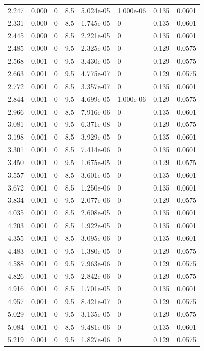 \documentclass[preview]{standalone}
\begin{document}
{{\begin{tabular}{L{1.2cm}C{1.2cm} C{0.3cm}C{0.5cm} C{1.4cm}C{1.4cm} C{1.4cm}C{1.4cm}}
  2.247  &  0.000  & 0     & 8.5 &  5.024e-05  & 1.000e-06  & 0.135 &  0.0601   \\ 
  2.331  &  0.000  & 0     & 8.5 &  1.745e-05  & 0  & 0.135 &  0.0601   \\ 
  2.445  &  0.000  & 0     & 8.5 &  2.221e-05  & 0  & 0.135 &  0.0601   \\ 
  2.485  &  0.000  & 0     & 9.5 &  2.325e-05  & 0  & 0.129 &  0.0575   \\ 
  2.568  &  0.001  & 0     & 9.5 &  3.430e-05  & 0  & 0.129 &  0.0575   \\ 
  2.663  &  0.001  & 0     & 9.5 &  4.775e-07  & 0  & 0.129 &  0.0575   \\ 
  2.772  &  0.001  & 0     & 8.5 &  3.357e-07  & 0  & 0.135 &  0.0601   \\ 
  2.844  &  0.001  & 0     & 9.5 &  4.699e-05  & 1.000e-06  & 0.129 &  0.0575   \\ 
  2.966  &  0.001  & 0     & 8.5 &  7.916e-06  & 0  & 0.135 &  0.0601   \\ 
  3.081  &  0.001  & 0     & 9.5 &  6.371e-08  & 0  & 0.129 &  0.0575   \\ 
  3.198  &  0.001  & 0     & 8.5 &  3.929e-05  & 0  & 0.135 &  0.0601   \\ 
  3.301  &  0.001  & 0     & 8.5 &  7.414e-06  & 0  & 0.135 &  0.0601   \\ 
  3.450  &  0.001  & 0     & 9.5 &  1.675e-05  & 0  & 0.129 &  0.0575   \\ 
  3.557  &  0.001  & 0     & 8.5 &  3.601e-05  & 0  & 0.135 &  0.0601   \\ 
  3.672  &  0.001  & 0     & 8.5 &  1.250e-06  & 0  & 0.135 &  0.0601   \\ 
  3.834  &  0.001  & 0     & 9.5 &  2.077e-06  & 0  & 0.129 &  0.0575   \\ 
  4.035  &  0.001  & 0     & 8.5 &  2.608e-05  & 0  & 0.135 &  0.0601   \\ 
  4.203  &  0.001  & 0     & 8.5 &  1.922e-05  & 0  & 0.135 &  0.0601   \\ 
  4.355  &  0.001  & 0     & 8.5 &  3.095e-06  & 0  & 0.135 &  0.0601   \\ 
  4.483  &  0.001  & 0     & 9.5 &  1.380e-05  & 0  & 0.129 &  0.0575   \\ 
  4.588  &  0.001  & 0     & 9.5 &  7.963e-06  & 0  & 0.129 &  0.0575   \\ 
  4.826  &  0.001  & 0     & 9.5 &  2.842e-06  & 0  & 0.129 &  0.0575   \\ 
  4.916  &  0.001  & 0     & 8.5 &  1.701e-05  & 0  & 0.135 &  0.0601   \\ 
  4.957  &  0.001  & 0     & 9.5 &  8.421e-07  & 0  & 0.129 &  0.0575   \\ 
  5.029  &  0.001  & 0     & 9.5 &  3.135e-05  & 0  & 0.129 &  0.0575   \\ 
  5.084  &  0.001  & 0     & 8.5 &  9.481e-06  & 0  & 0.135 &  0.0601   \\ 
  5.219  &  0.001  & 0     & 9.5 &  1.827e-06  & 0  & 0.129 &  0.0575   \\ 
\hline 
\end{tabular} 

}}
\end{document}

